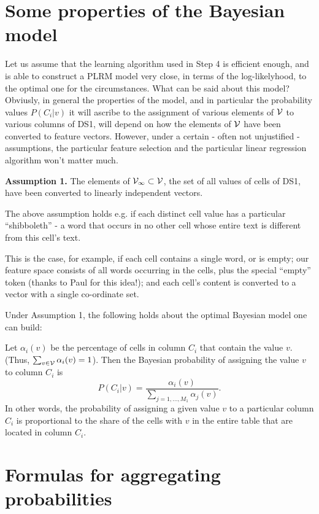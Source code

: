\documentclass[12pt]{article}
\begin{document}
\section{Some properties of the Bayesian model}

Let us assume that the learning algorithm used in Step 4 is efficient
enough, and is able to construct a PLRM model very close, in terms of
the log-likelyhood, to the optimal one for the circumstances. What can
be said about this model? Obviusly, in general the properties of the
model, and in particular the probability values $P(C_i|v)$ it will
ascribe to the assignment of various elements of $\cal{V}$ to various
columns of DS1, will depend on how the elements of $\cal{V}$ have been
converted to feature vectors. However, under a certain - often not
unjustified - assumptions, the particular feature selection and the
particular linear regression algorithm won't matter much. 

{\bf Assumption 1.} The elements of $\cal{V_1} \subset \cal{V}$, the
set of all values of cells of DS1, have been converted to linearly
independent vectors.

The above assumption holds e.g. if each distinct cell value has a
particular ``shibboleth'' - a word that occurs in no other cell whose
entire text is different from this cell's text. 

This is the case, for example, if each cell contains a single word, or
is empty; our feature space consists of all words occurring in the
cells, plus the special ``empty'' token (thanks to Paul for this
idea!); and each cell's content is converted to a vector with a single
co-ordinate set.

Under Assumption 1, the following holds about the optimal Bayesian model 
one can build:

Let $\alpha_i(v)$ be the percentage of cells in column $C_i$ that
contain the value $v$. (Thus, $\sum_{v\in \cal{V}} \alpha_i(v) =
  1$). Then the Bayesian probability of assigning the value $v$ to
  column $C_i$ is
\begin{equation}
\label{eq:bp}
P(C_i|v) = \frac{\alpha_i(v)}{\sum_{j=1,\ldots,M_1} \alpha_j(v)}.
\end{equation}
In other words, the probability of assigning a given value $v$ to a
  particular column $C_i$ is proportional to the share of the cells
  with $v$ in the entire table that are located in column $C_i$.

\section{Formulas for aggregating probabilities}
\label{sec:agg}
\end{document}
